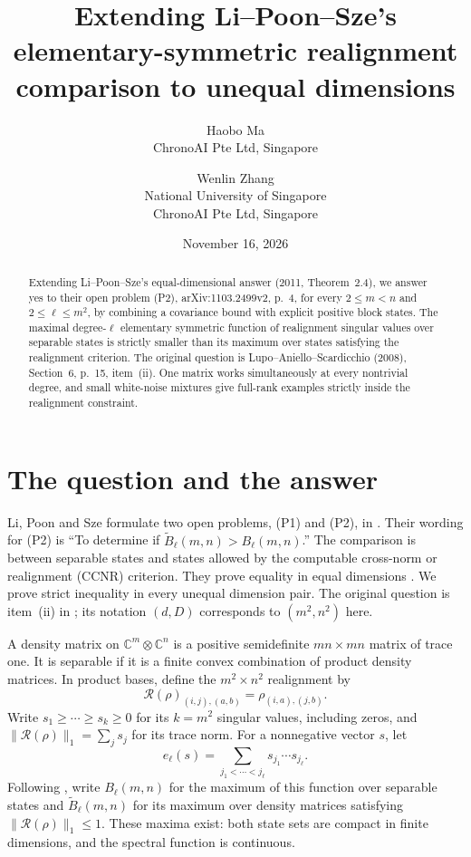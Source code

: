 \documentclass[11pt]{article}
\title{Extending Li--Poon--Sze's elementary-symmetric\newline
realignment comparison to unequal dimensions}
\author{Haobo Ma\\\small ChronoAI Pte Ltd, Singapore
\and Wenlin Zhang\\\small National University of Singapore\\
\small ChronoAI Pte Ltd, Singapore}
\date{November 16, 2026}
\newcommand{\R}{\mathcal R}
\newcommand{\e}{e}
\begin{document}
\maketitle
\begin{abstract}
Extending Li--Poon--Sze's equal-dimensional answer (2011, Theorem~2.4),
we answer yes to their open problem (P2), arXiv:1103.2499v2, p.~4,
for every $2\le m<n$ and $2\le\ell\le m^2$, by combining a covariance
bound with explicit positive block states.
The maximal degree-$\ell$ elementary symmetric function of realignment
singular values over separable states is strictly smaller than its maximum
over states satisfying the realignment criterion. The original question
is Lupo--Aniello--Scardicchio (2008), Section~6, p.~15, item~(ii).
One matrix works simultaneously at every nontrivial degree, and small
white-noise mixtures give full-rank examples strictly inside the
realignment constraint.
\end{abstract}

\section{The question and the answer}
Li, Poon and Sze formulate two open problems, (P1) and (P2), in
\cite[p.~4]{LPS}. Their wording for (P2) is ``To determine if
$\widetilde B_\ell(m,n)>B_\ell(m,n)$.'' The comparison is between
separable states and states allowed by the computable cross-norm or
realignment (CCNR) criterion. They prove equality in equal dimensions
\cite[Theorem~2.4]{LPS}. We prove strict inequality in every unequal
dimension pair. The original question is item~(ii) in
\cite[Section~6, p.~15]{LAS}; its notation $(d,D)$ corresponds to
$(m^2,n^2)$ here.

A density matrix on $\mathbb C^m\otimes\mathbb C^n$ is a positive
semidefinite $mn\times mn$ matrix of trace one. It is separable if it is a
finite convex combination of product density matrices. In product bases,
define the $m^2\times n^2$ realignment by
\[
 \R(\rho)_{(i,j),(a,b)}=\rho_{(i,a),(j,b)}.
\]
Write $s_1\ge\cdots\ge s_k\ge0$ for its $k=m^2$ singular values,
including zeros, and $\|\R(\rho)\|_1=\sum_j s_j$ for its trace norm.
For a nonnegative vector $s$, let
\[
 \e_\ell(s)=\sum_{j_1<\cdots<j_\ell}s_{j_1}\cdots s_{j_\ell}.
\]
Following \cite{LPS}, write $B_\ell(m,n)$ for the maximum of this
function over separable states and $\widetilde B_\ell(m,n)$ for its
maximum over density matrices satisfying $\|\R(\rho)\|_1\le1$.
These maxima exist: both state sets are compact in finite dimensions,
and the spectral function is continuous.
\end{document}
